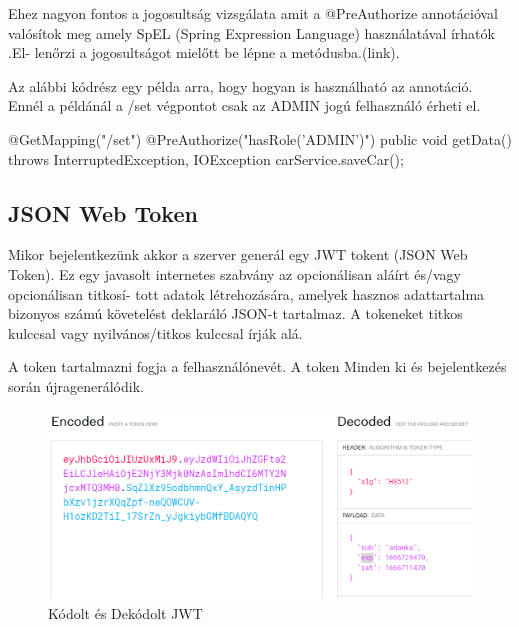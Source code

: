 Ehez nagyon fontos a jogosultság vizsgálata amit a @PreAuthorize annotációval valósítok meg amely SpEL (Spring Expression Language) használatával írhatók .El-
lenőrzi a jogosultságot mielőtt be lépne a metódusba.(link).

Az alábbi kódrész egy példa arra, hogy hogyan is használható az annotáció. Ennél a példánál a /set végpontot csak az ADMIN jogú felhasználó érheti el.

\begin{java}
@GetMapping("/set")
@PreAuthorize("hasRole('ADMIN')")
    public void getData() throws InterruptedException,
     IOException {
       carService.saveCar();
    }
\end{java}
\newpage

\subsection{JSON Web Token}
Mikor bejelentkezünk akkor a szerver generál egy JWT tokent (JSON Web Token)\cite{JWT}. Ez egy javasolt internetes szabvány az opcionálisan aláírt és/vagy opcionálisan titkosí-
tott adatok létrehozására, amelyek hasznos adattartalma bizonyos számú követelést deklaráló JSON-t tartalmaz. A tokeneket titkos kulccsal vagy nyilvános/titkos kulccsal írják alá.

A token tartalmazni fogja a felhasználónevét. A token Minden ki és bejelentkezés során újragenerálódik. 

\begin{figure}[h]
\centering
\includegraphics[scale=0.6]{images/jwt.io.png}
\caption{Kódolt és Dekódolt JWT\cite{JWTexample}}
\label{fig:JWT}
\end{figure}
